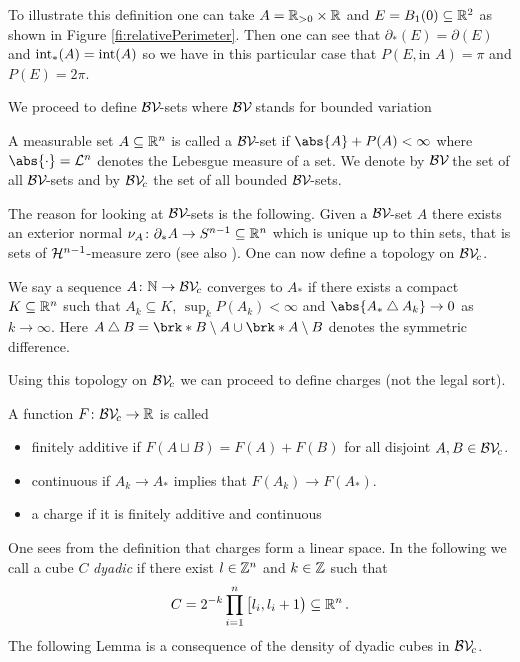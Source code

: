 \noindent To illustrate this definition one can take $A=\mathbb{R}_{>0}\times\mathbb{R}$ and $E=B_1(0)\subseteq\mathbb{R}^2$ as shown in Figure \ref{fi:relativePerimeter}. Then one can see that $\partial_*(E)=\partial (E)$ and $\operatorname{int}_*(A)=\operatorname{int}(A)$ so we have in this particular case that $P(E,\text{in }A)=\pi$ and $P(E)=2\pi$.

We proceed to define $\BV$-sets where $\BV$ stands for bounded variation

\begin{definition}[$\BV$-sets]
A measurable set $A\subseteq\mathbb{R}^n$ is called a $\BV$-set if $ \abs{A}+P(A)<\infty$ where $\abs{\cdot}=\cL^n$ denotes the Lebesgue measure of a set. We denote by $\BV$ the set of all $\BV$-sets and by $\BV_c$ the set of all bounded $\BV$-sets.
\end{definition}

\noindent The reason for looking at $\BV$-sets is the following. Given a $\BV$-set $A$ there exists an exterior normal $\nu_A\colon\partial_*A\to S^{n-1}\subseteq \mathbb{R}^n$ which is unique up to thin sets, that is sets of $\mathcal{H}^{n-1}$-measure zero (see also \cite{Pfe2016}). One can now define a topology on $\BV_c$.

\begin{definition}[Topology on $\BV_c$]
We say a sequence $A\colon\mathbb{N}\to \mathcal{BV\!}_c$ converges to $A_*$ if there exists a compact $K\subseteq\mathbb{R}^n$ such that $A_k\subseteq K$, $\sup_kP(A_k)<\infty$ and $\abs{A_*\symmDiff A_k}\to0$ as $k\to\infty$. Here $A\symmDiff B=\brk*{B\setminus A}\cup \brk*{A\setminus B}$ denotes the symmetric difference.
\end{definition}

\noindent Using this topology on $\BV_c$ we can proceed to define charges (not the legal sort).

\begin{definition}[Charge]
A function $F\colon \mathcal{BV\!}_c\to\mathbb{R}$ is called
\begin{itemize}
	\item finitely additive if $F(A\sqcup B) =F(A)+F(B)$ for all disjoint $A,B\in\mathcal{BV\!}_c$.
	\item continuous if $A_k\to A_*$ implies that $F(A_k)\to F(A_*)$.
	\item a charge if it is finitely additive and continuous
\end{itemize}
\end{definition}

\noindent One sees from the definition that charges form a linear space.
In the following we call a cube $C$ \textit{dyadic} if there exist  $l\in\mathbb{Z}^n$ and $k\in\mathbb{Z}$ such that
\begin{align*}
	C = 2^{-k}\prod_{i=1}^n\big[l_i,l_i+1\big)\subseteq\mathbb{R}^n\,.
\end{align*}
The following Lemma is a consequence of the density of dyadic cubes in $\BV_c$.

